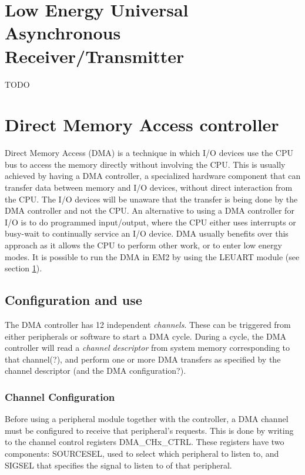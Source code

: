 \section{Low Energy Universal Asynchronous Receiver/Transmitter}\label{subsec:leuart}
TODO %


\section{Direct Memory Access controller}
Direct Memory Access (DMA) is a technique in which I/O devices use the CPU bus to access the memory directly without involving the CPU. 
This is usually achieved by having a DMA controller, a specialized hardware component that can transfer data between memory and I/O devices, without direct interaction from the CPU. The I/O devices will be unaware that the transfer is being done by the DMA controller and not the CPU. An alternative to using a DMA controller for I/O is to do programmed input/output, where the CPU either uses interrupts or busy-wait to continually service an I/O device. DMA usually benefits over this approach as it allows the CPU to perform other work, or to enter low energy modes.
It is possible to run the DMA in EM2 by using the LEUART module (see section \ref{subsec:leuart}).

\subsection{Configuration and use}
The DMA controller has 12 independent \emph{channels}. These can be triggered from either peripherals or software to start a DMA cycle. During a cycle, the DMA controller will read a \emph{channel descriptor} from system memory corresponding to that channel(?), and perform one or more DMA transfers as specified by the channel descriptor (and the DMA configuration?).

\subsubsection{Channel Configuration}
Before using a peripheral module together with the controller, a DMA channel must be configured to receive that peripheral's requests. This is done by writing to the channel control registers DMA\_CHx\_CTRL. These registers have two components: SOURCESEL, used to select which peripheral to listen to, and SIGSEL that specifies the signal to listen to of that peripheral.

